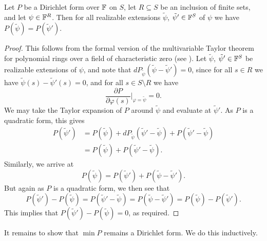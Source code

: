 \begin{lemma} \label{lem:welldefineddirichletmin}
  Let $P$ be a Dirichlet form over ${\mathbb F}$ on $S$, let $R \subseteq S$ be an
  inclusion of finite sets, and let $\psi \in {\mathbb F}^R$. Then for all realizable
  extensions $\tilde\psi$, $\tilde\psi' \in {\mathbb F}^S$ of $\psi$ we have $P(\tilde\psi) =
  P(\tilde\psi')$. 
\end{lemma}
\begin{proof}
  This follows from the formal version of the multivariable Taylor theorem for
  polynomial rings over a field of characteristic zero (see
  \cite[\textsection IV.4.5]{Bou90}). Let $\tilde\psi$,
  $\tilde\psi' \in {\mathbb F}^S$ be realizable extensions of $\psi$, and note that
  $dP_{\tilde\psi}(\tilde\psi-\tilde\psi')=0$, since for all $s \in R$ we have
  $\tilde\psi(s) -\tilde\psi'(s) =0$, and for all $s \in S \setminus R$ we have
  \[
    \frac{\partial P}{\partial \varphi(s)}\bigg\vert_{\varphi = \tilde\psi}=0. 
  \]
  We may take the Taylor expansion of $P$ around $\tilde\psi$ and evaluate at
  $\tilde\psi'$. As $P$ is a quadratic form, this gives
  \begin{align*}
    P(\tilde\psi') &=
    P(\tilde\psi)+dP_{\tilde\psi}(\tilde\psi'-\tilde\psi)+P(\tilde\psi'-\tilde\psi)
    \\
    & = P(\tilde\psi)+P(\tilde\psi'-\tilde\psi).
  \end{align*}
  Similarly, we arrive at  
  \[
    P(\tilde\psi)= P(\tilde\psi')+P(\tilde\psi-\tilde\psi').
  \]
  But again as $P$ is a quadratic form, we then see that 
  \[
    P(\tilde\psi')-P(\tilde\psi) = P(\tilde\psi'-\tilde\psi) =
    P(\tilde\psi-\tilde\psi') = P(\tilde\psi)-P(\tilde\psi').
  \]
  This implies that $P(\tilde\psi')-P(\tilde\psi) = 0$, as required.
\end{proof}

It remains to show that $\min P$ remains a Dirichlet form. We do this
inductively.

